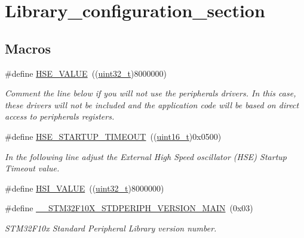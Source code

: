 \hypertarget{group___library__configuration__section}{}\section{Library\+\_\+configuration\+\_\+section}
\label{group___library__configuration__section}
\subsection*{Macros}
\begin{DoxyCompactItemize}
\item 
\#define \hyperlink{group___library__configuration__section_gaeafcff4f57440c60e64812dddd13e7cb}{H\+S\+E\+\_\+\+V\+A\+L\+UE}~((\hyperlink{_p_e___types_8h_a33594304e786b158f3fb30289278f5af}{uint32\+\_\+t})8000000)
\begin{DoxyCompactList}\small\item\em Comment the line below if you will not use the peripherals drivers. In this case, these drivers will not be included and the application code will be based on direct access to peripherals registers. \end{DoxyCompactList}\item 
\#define \hyperlink{group___library__configuration__section_ga68ecbc9b0a1a40a1ec9d18d5e9747c4f}{H\+S\+E\+\_\+\+S\+T\+A\+R\+T\+U\+P\+\_\+\+T\+I\+M\+E\+O\+UT}~((\hyperlink{_p_e___types_8h_a1f1825b69244eb3ad2c7165ddc99c956}{uint16\+\_\+t})0x0500)
\begin{DoxyCompactList}\small\item\em In the following line adjust the External High Speed oscillator (H\+SE) Startup Timeout value. \end{DoxyCompactList}\item 
\#define \hyperlink{group___library__configuration__section_gaaa8c76e274d0f6dd2cefb5d0b17fbc37}{H\+S\+I\+\_\+\+V\+A\+L\+UE}~((\hyperlink{_p_e___types_8h_a33594304e786b158f3fb30289278f5af}{uint32\+\_\+t})8000000)
\item 
\#define \hyperlink{group___library__configuration__section_ga4c236abf68876febcb304f05ed3bafac}{\+\_\+\+\_\+\+S\+T\+M32\+F10\+X\+\_\+\+S\+T\+D\+P\+E\+R\+I\+P\+H\+\_\+\+V\+E\+R\+S\+I\+O\+N\+\_\+\+M\+A\+IN}~(0x03)
\begin{DoxyCompactList}\small\item\em S\+T\+M32\+F10x Standard Peripheral Library version number. \end{DoxyCompactList}\item 

\end{DoxyCompactItemize}

